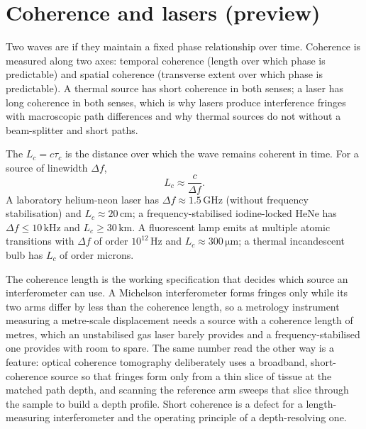 \section{Coherence and lasers (preview)}

Two waves are  if they maintain a fixed phase
relationship over time. Coherence is measured along two axes:
temporal coherence (length over which phase is predictable) and
spatial coherence (transverse extent over which phase is predictable).
A thermal source has short coherence in both senses; a laser has
long coherence in both senses, which is why lasers produce
interference fringes with macroscopic path differences and why
thermal sources do not without a beam-splitter and short paths.

The  $L_{c} = c\tau_{c}$ is the distance
over which the wave remains coherent in time. For a source of
linewidth $\Delta f$,
\[
L_{c} \approx \frac{c}{\Delta f}.
\]
A laboratory helium-neon laser has $\Delta f \approx 1.5\,\si{\giga
\hertz}$ (without frequency stabilisation) and $L_{c} \approx 20\,\si{
\centi\meter}$; a frequency-stabilised iodine-locked HeNe has $\Delta
f \le 10\,\si{\kilo\hertz}$ and $L_{c} \ge 30\,\si{\kilo\meter}$. A
fluorescent lamp emits at multiple atomic transitions with $\Delta f$
of order $10^{12}\,\si{\hertz}$ and $L_{c} \approx 300\,\si{\micro
\meter}$; a thermal incandescent bulb has $L_{c}$ of order microns.

The coherence length is the working specification that decides which source an
interferometer can use. A Michelson interferometer forms fringes only while
its two arms differ by less than the coherence length, so a metrology
instrument measuring a metre-scale displacement needs a source with a
coherence length of metres, which an unstabilised gas laser barely provides
and a frequency-stabilised one provides with room to spare. The same number
read the other way is a feature: optical coherence tomography deliberately
uses a broadband, short-coherence source so that fringes form only from a
thin slice of tissue at the matched path depth, and scanning the reference arm
sweeps that slice through the sample to build a depth profile. Short coherence
is a defect for a length-measuring interferometer and the operating principle
of a depth-resolving one.


